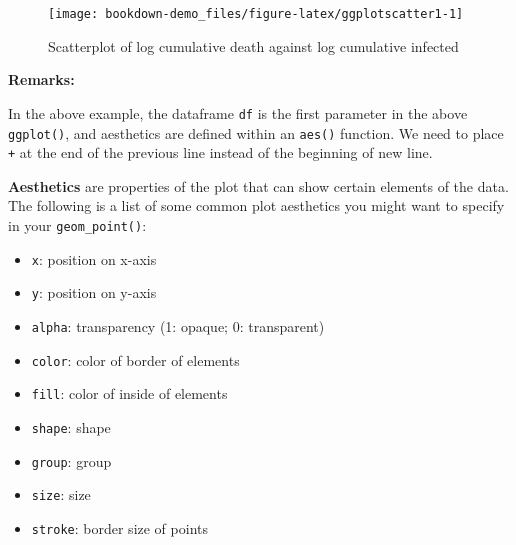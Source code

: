\documentclass[]{book}
\newenvironment{Shaded}{\begin{snugshade}}{\end{snugshade}}
\newcommand{\KeywordTok}[1]{\textcolor[rgb]{0.13,0.29,0.53}{\textbf{#1}}}
\newcommand{\DecValTok}[1]{\textcolor[rgb]{0.00,0.00,0.81}{#1}}
\newcommand{\StringTok}[1]{\textcolor[rgb]{0.31,0.60,0.02}{#1}}
\newcommand{\CommentTok}[1]{\textcolor[rgb]{0.56,0.35,0.01}{\textit{#1}}}
\newcommand{\OperatorTok}[1]{\textcolor[rgb]{0.81,0.36,0.00}{\textbf{#1}}}
\newcommand{\NormalTok}[1]{#1}
\providecommand{\tightlist}{%
  \setlength{\itemsep}{0pt}\setlength{\parskip}{0pt}}
\begin{document}
\begin{Shaded}
\end{Shaded}

\begin{figure}

{\centering \texttt{[image: bookdown-demo\_files/figure-latex/ggplotscatter1-1]} 

}

\caption{Scatterplot of log cumulative death against log cumulative infected}\label{fig:ggplotscatter1}
\end{figure}

\textbf{Remarks:}

In the above example, the dataframe \texttt{df} is the first parameter
in the above \texttt{ggplot()}, and aesthetics are defined within an
\texttt{aes()} function. We need to place \texttt{+} at the end of the
previous line instead of the beginning of new line.

\textbf{Aesthetics} are properties of the plot that can show certain
elements of the data. The following is a list of some common plot
aesthetics you might want to specify in your \texttt{geom\_point()}:

\begin{itemize}
\tightlist
\item
  \texttt{x}: position on x-axis
\item
  \texttt{y}: position on y-axis
\item
  \texttt{alpha}: transparency (1: opaque; 0: transparent)
\item
  \texttt{color}: color of border of elements
\item
  \texttt{fill}: color of inside of elements
\item
  \texttt{shape}: shape
\item
  \texttt{group}: group
\item
  \texttt{size}: size
\item
  \texttt{stroke}: border size of points
\end{itemize}
\end{document}
